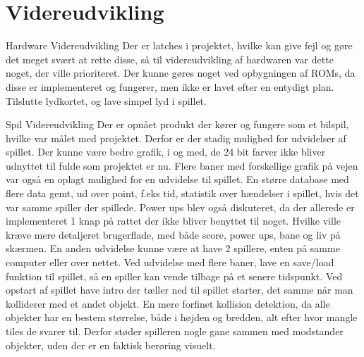 \section{Videreudvikling}

Hardware Videreudvikling
Der er latches i projektet, hvilke kan give fejl og gøre det meget svært at rette disse, så til videreudvikling af hardwaren var dette noget, der ville prioriteret. Der kunne gøres noget ved opbygningen af ROMs, da disse er implementeret og fungerer, men ikke er lavet efter en entydigt plan.
Tilslutte lydkortet, og lave simpel lyd i spillet.

Spil Videreudvikling
Der er opnået produkt der kører og fungere som et bilspil, hvilke var målet med projektet. Derfor er der stadig mulighed for udvidelser af spillet.
 Der kunne være bedre grafik, i og med, de 24 bit farver ikke bliver udnyttet til fulde som projektet er nu. Flere baner med forskellige grafik på vejen var også en oplagt mulighed for en udvidelse til spillet.
 En større database med flere data gemt, ud over point, f.eks tid, statistik over hændelser i spillet, hvis det var samme spiller der spillede.
 Power ups blev også diskuteret, da der allerede er implementeret 1 knap på rattet der ikke bliver benyttet til noget. Hvilke ville kræve mere detaljeret brugerflade, med både score, power ups, bane og liv på skærmen.
 En anden udvidelse kunne være at have 2 spillere, enten på samme computer eller over nettet.
 Ved udvidelse med flere baner, lave en save/load funktion til spillet, så en spiller kan vende tilbage på et senere tidspunkt.
 Ved opstart af spillet have intro der tæller ned til spillet starter, det samme når man kolliderer med et andet objekt.
 En mere forfinet kollision detektion, da alle objekter har en bestem størrelse, både i højden og bredden, alt efter hvor mangle tiles de svarer til. Derfor støder spilleren nogle gane sammen med modstander objekter, uden der er en faktisk berøring visuelt.
 
